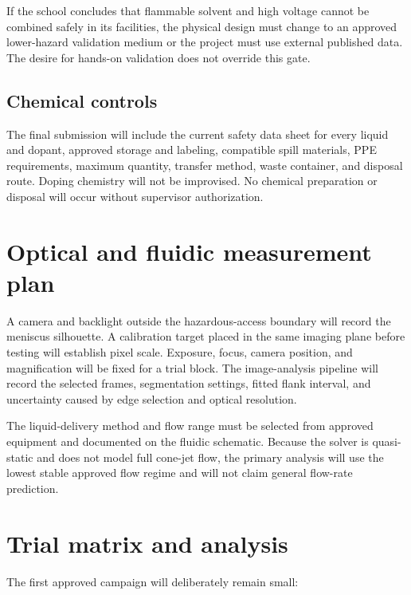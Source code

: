 \documentclass[11pt]{article}
\begin{document}
If the school concludes that flammable solvent and high voltage cannot be combined safely in its facilities, the physical design must change to an approved lower-hazard validation medium or the project must use external published data. The desire for hands-on validation does not override this gate.

\subsection{Chemical controls}

The final submission will include the current safety data sheet for every liquid and dopant, approved storage and labeling, compatible spill materials, PPE requirements, maximum quantity, transfer method, waste container, and disposal route. Doping chemistry will not be improvised. No chemical preparation or disposal will occur without supervisor authorization.

\section{Optical and fluidic measurement plan}

A camera and backlight outside the hazardous-access boundary will record the meniscus silhouette. A calibration target placed in the same imaging plane before testing will establish pixel scale. Exposure, focus, camera position, and magnification will be fixed for a trial block. The image-analysis pipeline will record the selected frames, segmentation settings, fitted flank interval, and uncertainty caused by edge selection and optical resolution.

The liquid-delivery method and flow range must be selected from approved equipment and documented on the fluidic schematic. Because the solver is quasi-static and does not model full cone-jet flow, the primary analysis will use the lowest stable approved flow regime and will not claim general flow-rate prediction.

\section{Trial matrix and analysis}

The first approved campaign will deliberately remain small:
\end{document}
